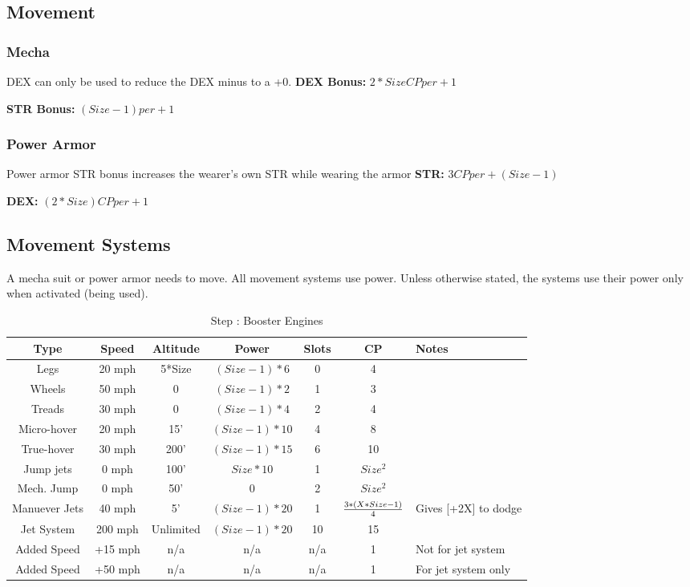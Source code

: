 \subsection{Movement }

\subsubsection{Mecha}
DEX can only be used to reduce the DEX minus to a +0.
\textbf{DEX Bonus:} $2*Size CP per +1$

\textbf{STR Bonus:} $(Size-1) per +1$

\subsubsection{Power Armor}
Power armor STR bonus increases the wearer's own STR while wearing the armor
\textbf{STR:} $3 CP per +(Size-1)$

\textbf{DEX:} $(2*Size) CP per +1$

\subsection{Movement Systems }

A mecha suit or power armor needs to move.  All movement systems use power.  Unless otherwise stated, the systems use their power only when activated (being used).

\begin{table}[htb]
\begin{center}
\begin{tabular}{c|c|c|c|c|c|p{1.5in}}
\textbf{Type} & \textbf{Speed} & \textbf{Altitude} & \textbf{Power} & \textbf{Slots} & \textbf{CP} & \textbf{Notes} \\
\hline
\hline
Legs & 20 mph & 5*Size & $(Size-1)*6$ & 0 & 4 \\ \hline
Wheels & 50 mph & 0 & $(Size-1)*2$ & 1 & 3 \\ \hline
Treads & 30 mph & 0 & $(Size-1)*4$ & 2 & 4 \\ \hline
Micro-hover & 20 mph & 15' & $(Size-1)*10$ & 4 & 8 \\ \hline
True-hover & 30 mph & 200' & $(Size-1)*15$ & 6 & 10 \\ \hline
Jump jets & 0 mph & 100' & $Size*10$ & 1 & $Size^2$ \\ \hline
Mech. Jump & 0 mph & 50' & 0 & 2 & $Size^2$ \\ \hline
Manuever Jets & 40 mph & 5' & $(Size-1)*20$ & 1 & ${3*(X*Size-1)}\over{4}$ & Gives [+2X] to dodge \\ \hline
Jet System & 200 mph & Unlimited & $(Size-1)*20$ & 10 & 15 \\ \hline
Added Speed & +15 mph & n/a & n/a & n/a & 1 & Not for jet system \\ \hline
Added Speed & +50 mph & n/a & n/a & n/a & 1 & For jet system only \\ \hline
\end{tabular}
\caption{Step : Booster Engines}
\end{center}
\end{table}
\addtocounter{MechaSteps}{1}

